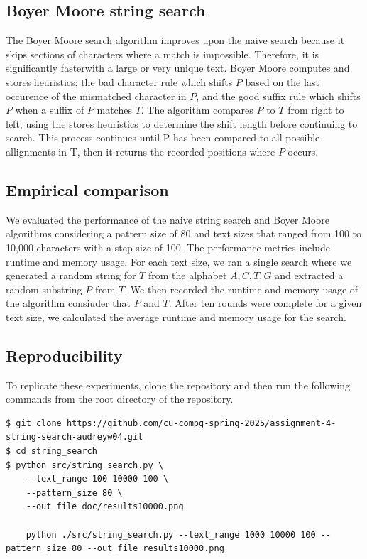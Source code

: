 \documentclass[11pt, letterpaper]{article}
\begin{document}
\subsection{Boyer Moore string search}
The Boyer Moore search algorithm improves upon the naive search because it 
skips sections of characters where a match is impossible. Therefore, it is 
significantly fasterwith a large or very unique text. Boyer Moore computes 
and stores heuristics: the bad character rule which shifts $P$ based on the 
last occurence of the mismatched character in $P$, and the good suffix rule 
which shifts $P$ when a suffix of $P$ matches $T$. The algorithm compares $P$ 
to $T$ from right to left, using the stores heuristics to determine the shift 
length before continuing to search. This process continues until P has been 
compared to all possible allignments in T, then it returns the recorded 
positions where $P$ occurs.

\subsection{Empirical comparison}
We evaluated the performance of the naive string search and Boyer Moore 
algorithms considering a pattern size of 80 and text sizes that ranged 
from 100 to 10,000 characters with a step size of 100.  The performance 
metrics include runtime and memory usage. For each text size, we ran a 
single search where we generated a random string for $T$ from the alphabet 
${A, C, T, G}$ and extracted a random substring $P$ from $T$. We then 
recorded the runtime and memory usage of the algorithm consiuder that $P$ 
and $T$. After ten rounds were complete for a given text size, we calculated 
the average runtime and memory usage for the search.

\subsection{Reproducibility}
To replicate these experiments, clone the repository and then run the
following commands from the root directory of the repository.

\begin{verbatim}
$ git clone https://github.com/cu-compg-spring-2025/assignment-4-string-search-audreyw04.git
$ cd string_search
$ python src/string_search.py \
    --text_range 100 10000 100 \
    --pattern_size 80 \
    --out_file doc/results10000.png

    python ./src/string_search.py --text_range 1000 10000 100 --pattern_size 80 --out_file results10000.png
\end{verbatim}
\end{document}
